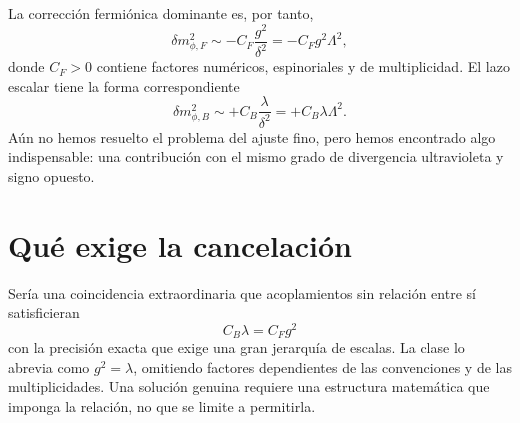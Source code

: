 \begin{classroomqa}
\end{classroomqa}

\begin{classroomqa}
\end{classroomqa}

La corrección fermiónica dominante es, por tanto,
\begin{equation}
\delta m_{\phi,F}^2
\sim -C_F\frac{g^2}{\delta^2}
=-C_Fg^2\Lambda^2,
\end{equation}
donde \(C_F>0\) contiene factores numéricos, espinoriales y de multiplicidad. El lazo escalar tiene la forma correspondiente
\begin{equation}
\delta m_{\phi,B}^2
\sim+C_B\frac{\lambda}{\delta^2}
=+C_B\lambda\Lambda^2.
\end{equation}
Aún no hemos resuelto el problema del ajuste fino, pero hemos encontrado algo indispensable: una contribución con el mismo grado de divergencia ultravioleta y signo opuesto.

\section{Qué exige la cancelación}

Sería una coincidencia extraordinaria que acoplamientos sin relación entre sí satisficieran
\begin{equation}
C_B\lambda=C_Fg^2
\end{equation}
con la precisión exacta que exige una gran jerarquía de escalas. La clase lo abrevia como \(g^2=\lambda\), omitiendo factores dependientes de las convenciones y de las multiplicidades. Una solución genuina requiere una estructura matemática que imponga la relación, no que se limite a permitirla.

